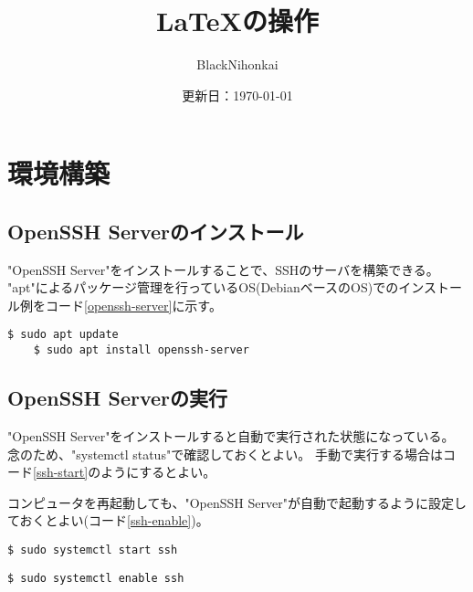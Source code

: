 \documentclass[a4paper,10pt]{jsarticle}
\title{LaTeXの操作}
\author{BlackNihonkai}
\date{更新日：\today}
\begin{document}
\maketitle



\section{環境構築}
  \subsection{OpenSSH Serverのインストール}
    "OpenSSH Server"をインストールすることで、SSHのサーバを構築できる。
  "apt"によるパッケージ管理を行っているOS(DebianベースのOS)でのインストール例をコード\ref{openssh-server}に示す。

  \begin{lstlisting}[caption=OpenSSH Serverのインストール,label=openssh-server]
    $ sudo apt update
    $ sudo apt install openssh-server
  \end{lstlisting}

  \subsection{OpenSSH Serverの実行}
    "OpenSSH Server"をインストールすると自動で実行された状態になっている。
    念のため、"systemctl status"で確認しておくとよい。
    手動で実行する場合はコード\ref{ssh-start}のようにするとよい。

    コンピュータを再起動しても、"OpenSSH Server"が自動で起動するように設定しておくとよい(コード\ref{ssh-enable})。

    \begin{lstlisting}[caption=OpenSSH Serverの起動,label=ssh-start]
      $ sudo systemctl start ssh
    \end{lstlisting}
    
    \begin{lstlisting}[caption=OpenSSH Serverの自動起動,label=ssh-enable]
      $ sudo systemctl enable ssh
    \end{lstlisting}
\end{document}
